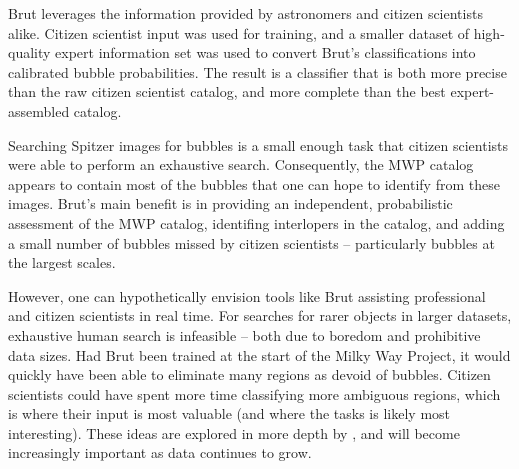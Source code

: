 \documentclass[preprint]{aastex}
\begin{document}
Brut leverages the information provided by astronomers and citizen scientists alike. Citizen scientist input was used for training, and a smaller dataset of high-quality expert information set was used to convert Brut's classifications into calibrated bubble probabilities. The result is a classifier that is both more precise than the raw citizen scientist catalog, and more complete than the best expert-assembled catalog.

Searching Spitzer images for bubbles is a small enough task that citizen scientists were able to perform an exhaustive search. Consequently, the MWP catalog appears to contain most of the bubbles that one can hope to identify from these images. Brut's main benefit is in providing an independent, probabilistic assessment of the MWP catalog, identifing interlopers in the catalog, and adding a small number of bubbles missed by citizen scientists -- particularly bubbles at the largest scales.

However, one can hypothetically envision tools like Brut assisting professional and citizen scientists in real time. For searches for rarer objects in larger datasets, exhaustive human search is infeasible -- both due to boredom and prohibitive data sizes. Had Brut been trained at the start of the Milky Way Project, it would quickly have been able to eliminate many regions as devoid of bubbles. Citizen scientists could have spent more time classifying more ambiguous regions, which is where their input is most valuable (and where the tasks is likely most interesting). These ideas are explored in more depth by \citep{MSR}, and will become increasingly important as data continues to grow.
\end{document}

